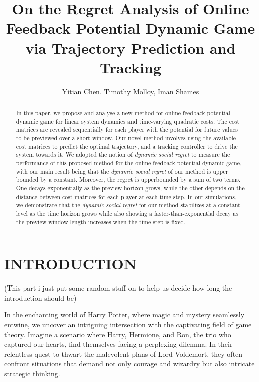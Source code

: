 \documentclass[letterpaper, 10 pt, conference]{ieeeconf}  %
\title{\LARGE \bf
On the Regret Analysis of Online Feedback Potential Dynamic Game via Trajectory Prediction and Tracking
}
\author{Yitian Chen, Timothy Molloy, Iman Shames%
}
\begin{document}
\maketitle
\thispagestyle{empty}
\pagestyle{empty}


\begin{abstract}
In this paper, we propose and analyse a new method for online feedback potential dynamic game for linear system dynamics and time-varying quadratic costs. The cost matrices are revealed sequentially for each player with the potential for future values to be previewed over a short window. Our novel method involves using the available cost matrices to predict the optimal trajectory, and a tracking controller to drive the system towards it. We adopted the notion of \emph{dynamic social regret} to measure the performance of this proposed method for the online feedback potential dynamic game, with our main result being that the \emph{dynamic social regret} of our method is upper bounded by a constant. Moreover, the regret is upperbounded by a sum of two terms. One decays exponentially as the preview horizon grows, while the other depends on the distance between cost matrices for each player at each time step. In our simulations, we demonstrate that the \emph{dynamic social regret} for our method stabilizes at a constant level as the time horizon grows while also showing a faster-than-exponential decay as the preview window length increases when the time step is fixed.
\end{abstract}


\section{INTRODUCTION}
(\color{red}This part i just put some random stuff on to help us decide how long the introduction should be\color{black})

In the enchanting world of Harry Potter, where magic and mystery seamlessly entwine, we uncover an intriguing intersection with the captivating field of game theory. Imagine a scenario where Harry, Hermione, and Ron, the trio who captured our hearts, find themselves facing a perplexing dilemma. In their relentless quest to thwart the malevolent plans of Lord Voldemort, they often confront situations that demand not only courage and wizardry but also intricate strategic thinking.
\end{document}
